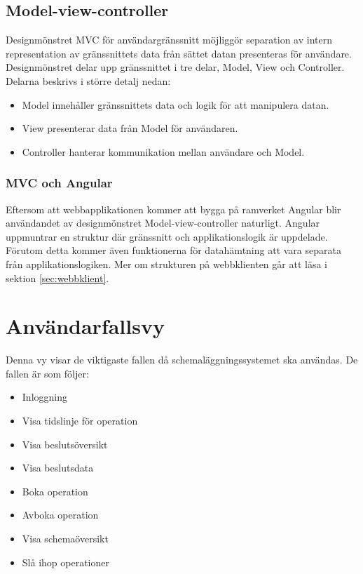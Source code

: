 \documentclass[a4paper,10pt]{article}
\begin{document}
\subsection{Model-view-controller}
Designmönstret MVC för användargränssnitt möjliggör separation av intern representation av gränssnittets data från sättet datan presenteras för användare. Designmönstret delar upp gränssnittet i tre delar, Model, View och Controller. Delarna beskrivs i större detalj nedan:
\begin{itemize}
  \item Model innehåller gränssnittets data och logik för att manipulera datan.
  \item View presenterar data från Model för användaren.
  \item Controller hanterar kommunikation mellan användare och Model.
\end{itemize}

\subsubsection{MVC och Angular}

Eftersom att webbapplikationen kommer att bygga på ramverket Angular blir användandet av designmönstret Model-view-controller naturligt. Angular uppmuntrar en struktur där gränssnitt och applikationslogik är uppdelade. Förutom detta kommer även funktionerna för datahämtning att vara separata från applikationslogiken. Mer om strukturen på webbklienten går att läsa i sektion \ref{sec:webbklient}.

\section{Användarfallsvy}

Denna vy visar de viktigaste fallen då schemaläggningssystemet ska användas. De fallen är som följer:
\begin{itemize}
	\item Inloggning
	\item Visa tidslinje för operation
	\item Visa beslutsöversikt
	\item Visa beslutsdata
	\item Boka operation
	\item Avboka operation
	\item Visa schemaöversikt
	\item Slå ihop operationer
\end{itemize}
\end{document}
